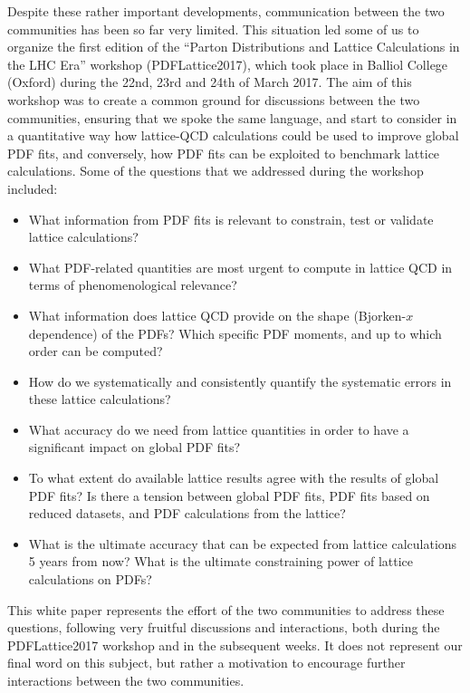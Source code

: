 Despite these rather important developments, communication between the
two communities has been so far very limited. This situation led some of us
to organize the first edition of the ``Parton Distributions and Lattice Calculations in the LHC Era''
workshop (PDFLattice2017), which took
place in Balliol College (Oxford) during the 22nd, 23rd and 24th of March 2017.
%
The aim of this workshop was to create a common ground for discussions
between the two communities, ensuring that we spoke the same language,
and start to consider in a quantitative way how lattice-QCD calculations could be used
to improve global PDF fits, and conversely, how PDF fits can be exploited to benchmark lattice calculations.
%
Some of the questions that we addressed during the workshop
included:
\begin{itemize}
\item What information from PDF fits is relevant to constrain, test or validate lattice calculations?

\item What PDF-related quantities are most urgent
  to compute in lattice QCD in terms of phenomenological relevance?

\item What information does lattice QCD provide on the
  shape (Bjorken-$x$ dependence) of the PDFs? Which specific
  PDF moments,
  and up to which order can be computed?
  
\item How do we systematically and consistently quantify the systematic errors in these lattice calculations?

\item What accuracy do we need from lattice quantities 
  in order to have a significant impact on global PDF fits?

\item To what extent do available lattice results agree with the results of
  global PDF fits? Is there a tension between global PDF fits, PDF
  fits based on reduced datasets, and PDF calculations from the lattice?

  \item What is the ultimate accuracy that can be expected from lattice
calculations 5 years from now? What is the ultimate
constraining power of lattice calculations on PDFs?

\end{itemize}

This white paper represents the effort of the two communities to address these questions, 
following very fruitful discussions and interactions, both during 
the PDFLattice2017 workshop and in the subsequent weeks.
%
It does not represent our final word on this subject, but rather a motivation to encourage further
interactions between the two communities.

